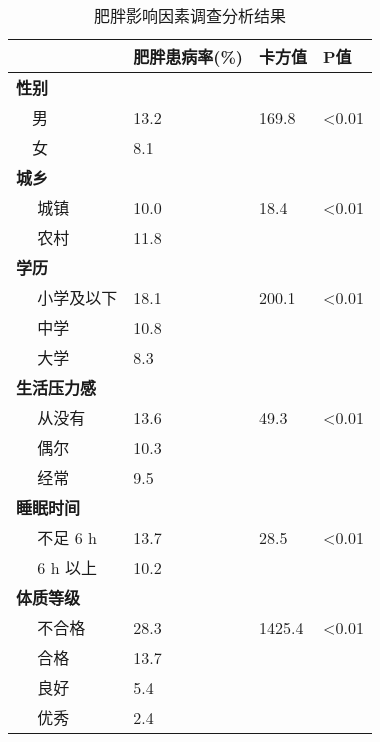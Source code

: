 \documentclass{article}
\begin{document}
\begin{table}[!htbp]
	\caption{肥胖影响因素调查分析结果}\label{tab:obese_reason} \centering
	\begin{tabular}{llll}
		\toprule
		& \textbf{肥胖患病率}(\%) & \textbf{卡方值} & \textbf{P值}\\
		\midrule
		\textbf{性别}     &      &        &                 \\
		~~男      & 13.2 & 169.8  & \textless{}0.01 \\
		\ \ 女      & 8.1  &        &                 \\
		\textbf{城乡}     &      &        &                 \\
		~~ 城镇     & 10.0 & 18.4   & \textless{}0.01 \\
		~~ 农村     & 11.8 &        &                 \\
		\textbf{学历}     &      &        &                 \\
		~~ 小学及以下  & 18.1 & 200.1  & \textless{}0.01 \\
		~~ 中学     & 10.8 &        &                 \\
		~~ 大学     & 8.3  &        &                 \\
		\textbf{生活压力感}  &      &        &                 \\
		~~ 从没有    & 13.6 & 49.3   & \textless{}0.01 \\
		~~ 偶尔     & 10.3 &        &                 \\
		~~ 经常     & 9.5  &        &                 \\
		\textbf{睡眠时间}   &      &        &                 \\
		~~ 不足 6 h & 13.7 & 28.5   & \textless{}0.01 \\
		~~ 6 h 以上 & 10.2 &        &                 \\
		\textbf{体质等级}   &      &        &                 \\
		~~ 不合格    & 28.3 & 1425.4 & \textless{}0.01 \\
		~~ 合格     & 13.7 &        &                 \\
		~~ 良好     & 5.4  &        &                 \\
		~~ 优秀     & 2.4  &        &                 \\
		\bottomrule
	\end{tabular}
\end{table}
\end{document}

